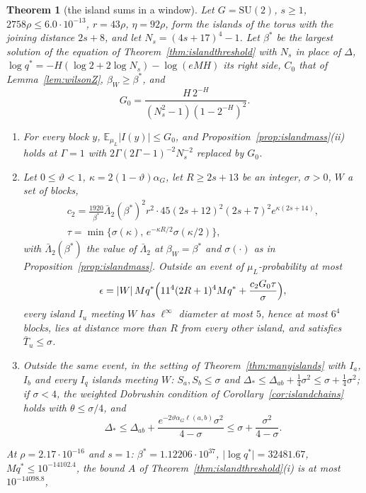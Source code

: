 \documentclass[11pt]{amsart}
\newtheorem{theorem}{Theorem}[section]
\theoremstyle{definition}
\theoremstyle{remark}
\numberwithin{equation}{section}
\newcommand{\E}{\mathbb{E}}
\newcommand{\SU}{\mathrm{SU}}
\begin{document}
\begin{theorem}[the island sums in a window]\label{thm:islandwindow}
Let $G=\SU(2)$, $s\ge1$, $2758\rho\le6.0\cdot10^{-13}$, $r=43\rho$,
$\eta=92\rho$, form the islands of the torus with the joining distance
$2s+8$, and let $N_s=(4s+17)^4-1$. Let $\beta^*$ be the largest solution
of the equation of Theorem~\ref{thm:islandthreshold} with $N_s$ in place of
$\varDelta$, $\log q^*=-H(\log2+2\log N_s)-\log(eMH)$ its right side, $C_0$ that of
Lemma~\ref{lem:wilsonZ},
$\beta_W\ge\beta^*$, and
\[
G_0=\frac{H\,2^{-H}}{(N_s^2-1)(1-2^{-H})^2}.
\]
\begin{enumerate}[label=\textup{(\roman*)},leftmargin=*]
\item For every block $y$, $\E_{\mu_L}\lvert I(y)\rvert\le G_0$, and
Proposition~\ref{prop:islandmass}(ii) holds at $\varGamma=1$ with
$2\varGamma(2\varGamma-1)^{-2}N_s^{-2}$ replaced by $G_0$.
\item Let $0\le\vartheta<1$, $\kappa=2(1-\vartheta)\alpha_G$, let $R\ge
2s+13$ be an integer, $\sigma>0$, $W$ a set of blocks,
\begin{gather*}
c_2=\frac{1920}{\beta^*}\bar\Lambda_2(\beta^*)^2r^2\cdot45(2s+12)^2
(2s+7)^2e^{\kappa(2s+14)},\\
\tau=\min\bigl\{\sigma(\kappa),\,e^{-\kappa R/2}\sigma(\kappa/2)\bigr\},
\end{gather*}
with $\bar\Lambda_2(\beta^*)$ the value of $\bar\Lambda_2$ at $\beta_W=
\beta^*$ and $\sigma(\cdot)$ as in Proposition~\ref{prop:islandmass}.
Outside an event of $\mu_L$-probability at most
\[
\epsilon=\lvert W\rvert\,Mq^*\Bigl(11^4(2R+1)^4Mq^*+\frac{c_2G_0\tau}
\sigma\Bigr),
\]
every island $I_u$ meeting $W$ has $\ell^\infty$ diameter at most $5$,
hence at most $6^4$ blocks, lies at distance more than $R$ from every other
island, and satisfies $\bar T_u\le\sigma$.
\item Outside the same event, in the setting of
Theorem~\ref{thm:manyislands} with $I_a$, $I_b$ and every $I_q$ islands
meeting $W$: $S_a,S_b\le\sigma$ and $\varDelta_*\le\varDelta_{ab}+\frac14
\sigma^2\le\sigma+\frac14\sigma^2$; if $\sigma<4$, the weighted Dobrushin
condition of Corollary~\ref{cor:islandchains} holds with $\theta\le\sigma/4$,
and
\[
\varDelta_*\le\varDelta_{ab}+\frac{e^{-2\vartheta\alpha_G\ell(a,b)}\sigma^2}
{4-\sigma}\le\sigma+\frac{\sigma^2}{4-\sigma}.
\]
\end{enumerate}
At $\rho=2.17\cdot10^{-16}$ and $s=1$: $\beta^*=1.12206\cdot10^{37}$,
$\lvert\log q^*\rvert=32481.67$, $Mq^*\le10^{-14102.4}$, the bound $A$ of
Theorem~\ref{thm:islandthreshold}(i) is at most $10^{-14098.8}$,

\end{theorem}
\end{document}
